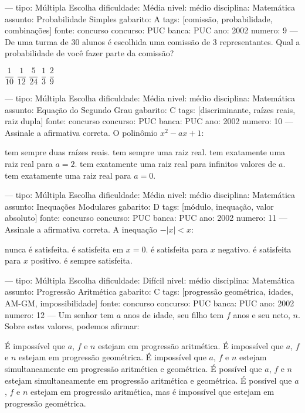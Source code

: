 ---
tipo: Múltipla Escolha
dificuldade: Média
nivel: médio
disciplina: Matemática
assunto: Probabilidade Simples
gabarito: A
tags: [comissão, probabilidade, combinações]
fonte: concurso
concurso: PUC
banca: PUC
ano: 2002
numero: 9
---
\question
De uma turma de 30 alunos é escolhida uma comissão de 3 representantes. Qual a probabilidade de você fazer parte da comissão?
\begin{choices}
\CorrectChoice $\dfrac{1}{10}$
\choice $\dfrac{1}{12}$
\choice $\dfrac{5}{24}$
\choice $\dfrac{1}{3}$
\choice $\dfrac{2}{9}$
\end{choices}

---
tipo: Múltipla Escolha
dificuldade: Média
nivel: médio
disciplina: Matemática
assunto: Equação do Segundo Grau
gabarito: C
tags: [discriminante, raízes reais, raiz dupla]
fonte: concurso
concurso: PUC
banca: PUC
ano: 2002
numero: 10
---
\question
Assinale a afirmativa correta. O polinômio $x^2 - ax + 1$:
\begin{choices}
\choice tem sempre duas raízes reais.
\choice tem sempre uma raiz real.
\CorrectChoice tem exatamente uma raiz real para $a = 2$.
\choice tem exatamente uma raiz real para infinitos valores de $a$.
\choice tem exatamente uma raiz real para $a = 0$.
\end{choices}

---
tipo: Múltipla Escolha
dificuldade: Média
nivel: médio
disciplina: Matemática
assunto: Inequações Modulares
gabarito: D
tags: [módulo, inequação, valor absoluto]
fonte: concurso
concurso: PUC
banca: PUC
ano: 2002
numero: 11
---
\question
Assinale a afirmativa correta. A inequação $-|x| < x$:
\begin{choices}
\choice nunca é satisfeita.
\choice é satisfeita em $x = 0$.
\choice é satisfeita para $x$ negativo.
\CorrectChoice é satisfeita para $x$ positivo.
\choice é sempre satisfeita.
\end{choices}

---
tipo: Múltipla Escolha
dificuldade: Difícil
nivel: médio
disciplina: Matemática
assunto: Progressão Aritmética
gabarito: C
tags: [progressão geométrica, idades, AM-GM, impossibilidade]
fonte: concurso
concurso: PUC
banca: PUC
ano: 2002
numero: 12
---
\question
Um senhor tem $a$ anos de idade, seu filho tem $f$ anos e seu neto, $n$. Sobre estes valores, podemos afirmar:
\begin{choices}
\choice É impossível que $a$, $f$ e $n$ estejam em progressão aritmética.
\choice É impossível que $a$, $f$ e $n$ estejam em progressão geométrica.
\CorrectChoice É impossível que $a$, $f$ e $n$ estejam simultaneamente em progressão aritmética e geométrica.
\choice É possível que $a$, $f$ e $n$ estejam simultaneamente em progressão aritmética e geométrica.
\choice É possível que $a$, $f$ e $n$ estejam em progressão aritmética, mas é impossível que estejam em progressão geométrica.
\end{choices}

